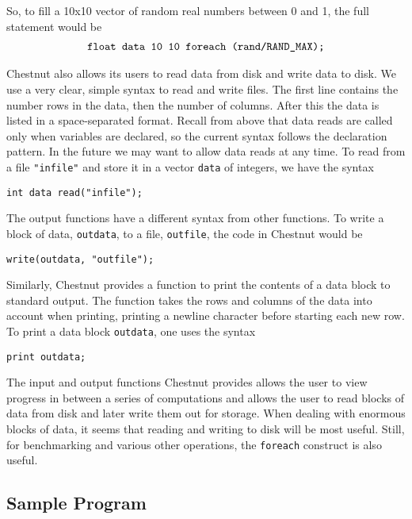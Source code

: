 \documentclass[twocolumn]{article}
\renewcommand{\|}{\origbar} %
\newcommand{\code}[1]{\texttt{#1}}
\begin{document}
So, to fill a 10x10 vector of random real numbers between 0 and 1, the full statement would be
\begin{align*}
  \if@twocolumn
    \code{float } &\code{data 10 10 } \\ &\code{foreach (rand/RAND\_MAX);}
  \else
    \code{float data 10 10 foreach (rand/RAND\_MAX);}
  \fi
\end{align*}

Chestnut also allows its users to read data from disk and write data to disk. We use a very clear, simple syntax to read and write files. The first line contains the number rows in the data, then the number of columns. After this the data is listed in a space-separated format. Recall from above that data reads are called only when variables are declared, so the current syntax follows the declaration pattern. In the future we may want to allow data reads at any time. To read from a file \code{"infile"} and store it in a vector \code{data} of integers, we have the syntax
\begin{center}
  \code{int data read("infile");}
\end{center}

The output functions have a different syntax from other functions. To write a block of data, \code{outdata}, to a file, \code{outfile}, the code in Chestnut would be
\begin{center}
  \code{write(outdata, "outfile");}
\end{center}

Similarly, Chestnut provides a function to print the contents of a data block to standard output. The function takes the rows and columns of the data into account when printing, printing a newline character before starting each new row. To print a data block \code{outdata}, one uses the syntax
\begin{center}
  \code{print outdata;}
\end{center}

The input and output functions Chestnut provides allows the user to view progress in between a series of computations and allows the user to read blocks of data from disk and later write them out for storage. When dealing with enormous blocks of data, it seems that reading and writing to disk will be most useful. Still, for benchmarking and various other operations, the \code{foreach} construct is also useful.

\subsection{Sample Program}
\end{document}

